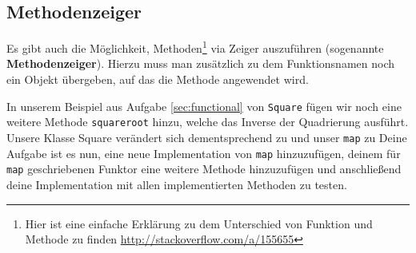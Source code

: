 \subsection{\ExercisePrefixAdvanced Methodenzeiger \optional}
\optionaltextbox
{}
\label{sec:functional_method}
Es gibt auch die Möglichkeit, Methoden\footnote{Hier ist eine einfache Erklärung zu dem Unterschied von Funktion und Methode zu finden \url{http://stackoverflow.com/a/155655}} via Zeiger auszuführen (sogenannte \textbf{Methodenzeiger}).
Hierzu muss man zusätzlich zu dem Funktionsnamen noch ein Objekt übergeben, auf das die Methode angewendet wird.

In unserem Beispiel aus Aufgabe \ref{sec:functional} von \lstinline{Square} fügen wir noch eine weitere Methode \lstinline{squareroot} hinzu, welche das Inverse der Quadrierung ausführt.
Unsere Klasse Square verändert sich dementsprechend zu
%
%
und unser \lstinline{map} zu 
%
%
Deine Aufgabe ist es nun, eine neue Implementation von \lstinline{map} hinzuzufügen, deinem für \lstinline{map} geschriebenen Funktor eine weitere Methode hinzuzufügen und anschließend deine Implementation mit allen implementierten Methoden zu testen.